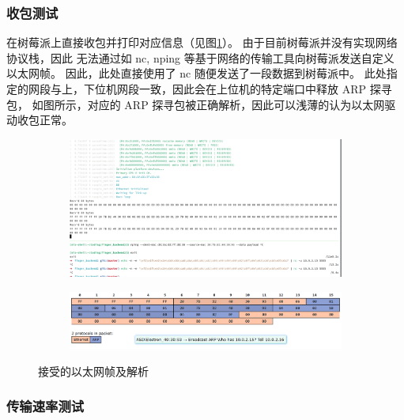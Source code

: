     \subsubsection{收包测试}

    在树莓派上直接收包并打印对应信息（见图\ref{test::以太网帧接收}）。
    由于目前树莓派并没有实现网络协议栈，因此
    无法通过如 nc, nping 等基于网络的传输工具向树莓派发送自定义以太网帧。
    因此，此处直接使用了 nc 随便发送了一段数据到树莓派中。
    此处指定的网段与上，下位机网段一致，因此会在上位机的特定端口中释放 ARP 探寻包，
    如图所示，对应的 ARP 探寻包被正确解析，因此可以浅薄的认为以太网驱动收包正常。

    \begin{figure}[ht]
        \centering
        \begin{subfigure}
            \centering
            \includegraphics[width=\textwidth]{./imgs/测试-以太网帧接收.png}
        \end{subfigure}
        \hfill
        \begin{subfigure}
            \centering
            \includegraphics[width=\textwidth]{./imgs/测试-以太网帧接收-解析.png}
        \end{subfigure}
        \caption{接受的以太网帧及解析} \label{test::以太网帧接收}
    \end{figure}

    \subsubsection{传输速率测试}


